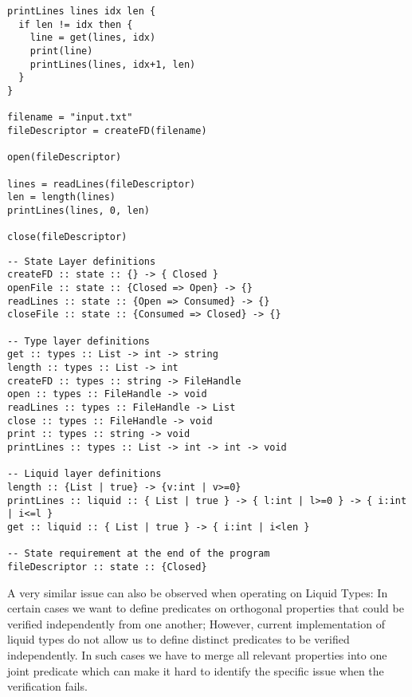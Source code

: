 \documentclass{easychair}
\newcommand{\LayeredTypes}{\textsc{LayeredTypes}}
\begin{document}
\begin{minipage}{0.4\linewidth}
\begin{lstlisting}[caption={Simple example code},label={lst:code_before}]
printLines lines idx len {
  if len != idx then {
    line = get(lines, idx)
    print(line)
    printLines(lines, idx+1, len)
  }
}

filename = "input.txt"
fileDescriptor = createFD(filename)

open(fileDescriptor)

lines = readLines(fileDescriptor)
len = length(lines)
printLines(lines, 0, len)

close(fileDescriptor)
\end{lstlisting}
\end{minipage}%
\begin{minipage}{0.59\linewidth}
\begin{lstlisting}[caption={Annotations for \LayeredTypes},label={lst:code_after}]
-- State Layer definitions
createFD :: state :: {} -> { Closed }
openFile :: state :: {Closed => Open} -> {}
readLines :: state :: {Open => Consumed} -> {}
closeFile :: state :: {Consumed => Closed} -> {}

-- Type layer definitions
get :: types :: List -> int -> string
length :: types :: List -> int
createFD :: types :: string -> FileHandle
open :: types :: FileHandle -> void
readLines :: types :: FileHandle -> List
close :: types :: FileHandle -> void
print :: types :: string -> void
printLines :: types :: List -> int -> int -> void

-- Liquid layer definitions
length :: {List | true} -> {v:int | v>=0}
printLines :: liquid :: { List | true } -> { l:int | l>=0 } -> { i:int | i<=l }
get :: liquid :: { List | true } -> { i:int | i<len }

-- State requirement at the end of the program
fileDescriptor :: state :: {Closed}	
\end{lstlisting}
\end{minipage}

A very similar issue can also be observed when operating on Liquid Types: In certain cases we want to define predicates on orthogonal properties that could be verified independently from one another; However, current implementation of liquid types do not allow us to define distinct predicates to be verified independently. In such cases we have to merge all relevant properties into one joint predicate which can make it hard to identify the specific issue when the verification fails.
\end{document}
